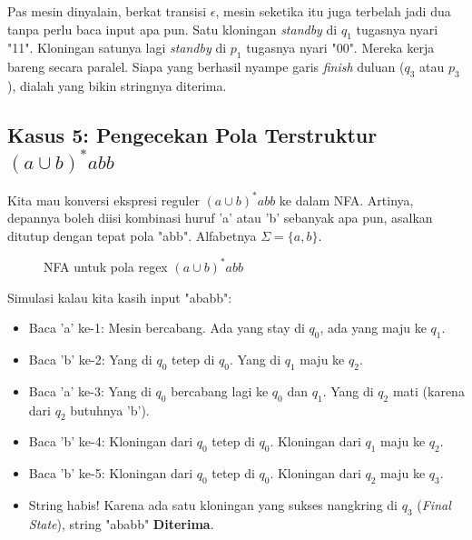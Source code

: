 \documentclass[12pt,a4paper]{article}
\begin{document}
Pas mesin dinyalain, berkat transisi $\epsilon$, mesin seketika itu juga terbelah jadi dua tanpa perlu baca input apa pun. Satu kloningan \textit{standby} di $q_1$ tugasnya nyari "11". Kloningan satunya lagi \textit{standby} di $p_1$ tugasnya nyari "00". Mereka kerja bareng secara paralel. Siapa yang berhasil nyampe garis \textit{finish} duluan ($q_3$ atau $p_3$), dialah yang bikin stringnya diterima.

\subsection{Kasus 5: Pengecekan Pola Terstruktur $(a \cup b)^* a b b$}
Kita mau konversi ekspresi reguler $(a \cup b)^* a b b$ ke dalam NFA. Artinya, depannya boleh diisi kombinasi huruf 'a' atau 'b' sebanyak apa pun, asalkan ditutup dengan tepat pola "abb". Alfabetnya $\Sigma=\{a,b\}$.

\begin{figure}[h]
    \centering
    \caption{NFA untuk pola regex $(a \cup b)^* a b b$}
\end{figure}

Simulasi kalau kita kasih input "ababb":
\begin{itemize}
    \item Baca 'a' ke-1: Mesin bercabang. Ada yang stay di $q_0$, ada yang maju ke $q_1$.
    \item Baca 'b' ke-2: Yang di $q_0$ tetep di $q_0$. Yang di $q_1$ maju ke $q_2$.
    \item Baca 'a' ke-3: Yang di $q_0$ bercabang lagi ke $q_0$ dan $q_1$. Yang di $q_2$ mati (karena dari $q_2$ butuhnya 'b').
    \item Baca 'b' ke-4: Kloningan dari $q_0$ tetep di $q_0$. Kloningan dari $q_1$ maju ke $q_2$.
    \item Baca 'b' ke-5: Kloningan dari $q_0$ tetep di $q_0$. Kloningan dari $q_2$ maju ke $q_3$.
    \item String habis! Karena ada satu kloningan yang sukses nangkring di $q_3$ (\textit{Final State}), string "ababb" \textbf{Diterima}.
\end{itemize}
\end{document}
